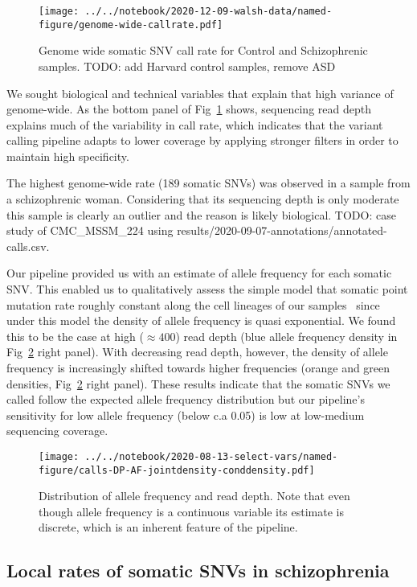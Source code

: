 \documentclass[letterpaper]{article}
\begin{document}
\begin{figure}
\texttt{[image: ../../notebook/2020-12-09-walsh-data/named-figure/genome-wide-callrate.pdf]}
\caption{Genome wide somatic SNV call rate for Control and Schizophrenic samples.  TODO:
	add Harvard control samples, remove ASD}
\label{fig:genomewide-calls}
\end{figure}

We sought biological and technical variables that explain that high variance of
genome-wide.  As the bottom panel of Fig~\ref{fig:genomewide-calls} shows,
sequencing read depth explains much of the variability in call rate, which
indicates that the variant calling pipeline adapts to lower coverage by
applying stronger filters in order to maintain high specificity.

The highest genome-wide rate (189 somatic SNVs) was observed in a sample from
a schizophrenic woman.  Considering that its sequencing depth is only moderate
this sample is clearly an outlier and the reason is likely biological. TODO:
case study of CMC\_MSSM\_224 using
results/2020-09-07-annotations/annotated-calls.csv.

Our pipeline provided us with an estimate of allele frequency for each somatic
SNV.  This enabled us to qualitatively assess the simple model that somatic
point mutation rate roughly constant along the cell lineages of our
samples~\citep{Rodin2021} since under this model the density of allele
frequency is quasi exponential.  We found this to be the case at high
(\(\approx 400\)) read depth (blue allele frequency density in Fig~\ref{fig:AF}
right panel).  With decreasing read depth, however, the density of allele
frequency is increasingly shifted towards higher frequencies (orange and green
densities, Fig~\ref{fig:AF} right panel).  These results indicate that the somatic
SNVs we called follow the expected allele frequency distribution but our
pipeline's sensitivity for low allele frequency (below c.a 0.05) is low at
low-medium sequencing coverage.

\begin{figure}
\texttt{[image: ../../notebook/2020-08-13-select-vars/named-figure/calls-DP-AF-jointdensity-conddensity.pdf]}
\caption{
Distribution of allele frequency and read depth.  Note that even though allele frequency is
a continuous variable its estimate is discrete, which is an inherent feature
of the pipeline.
}
\label{fig:AF}
\end{figure}

\subsection*{Local rates of somatic SNVs in schizophrenia}
\end{document}
